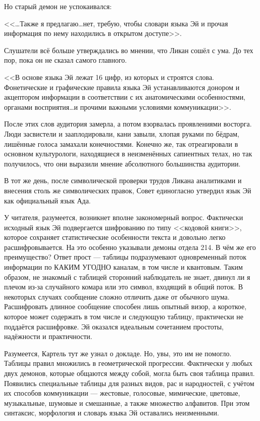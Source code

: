\documentclass[a4paper,10pt]{book}
\begin{document}
Но старый демон не успокаивался:

<<\dots Также я предлагаю\ldots нет, требую, чтобы словари языка Эй и прочая 
информация по нему находились в открытом доступе>>.

Слушатели всё больше утверждались во мнении, что Ликан сошёл с ума. До тех пор, 
пока он не сказал самого главного.

<<В основе языка Эй лежат 16 цифр, из которых и строятся слова. Фонетические и 
графические правила языка Эй устанавливаются донором и акцептором информации в 
соответствии с их анатомическими особенностями, органами восприятия\ldots и 
прочими важными условиями коммуникации>>.

После этих слов аудитория замерла, а потом взорвалась проявлениями восторга. 
Люди засвистели и зааплодировали, кани завыли, хлопая руками по бёдрам, 
лишённые голоса замахали конечностями. Конечно же, так отреагировали в основном 
культурологи, находящиеся в неизменённых сапиентных телах, но так получилось, 
что они выразили мнение абсолютного большинства аудитории.

В тот же день, после символической проверки трудов Ликана аналитиками и 
внесения столь же символических правок, Совет единогласно утвердил язык Эй как 
официальный язык Ада.

У читателя, разумеется, возникнет вполне закономерный вопрос. Фактически 
исходный язык Эй подвергается
шифрованию по типу <<кодовой книги>>, которое сохраняет статистические 
особенности текста и довольно легко расшифровывается. На это особенно указывали 
демоны отдела 214. В чём же его преимущество? Ответ прост --- таблицы 
подразумевают одновременный поток 
информации по КАКИМ УГОДНО каналам, в том числе и квантовым. Таким образом, не 
знакомый с таблицей сторонний наблюдатель не знает, двинул ли я плечом из-за 
случайного комара или это символ, входящий в общий поток. В некоторых случаях 
сообщение сложно отличить даже от обычного шума. Расшифровать длинное сообщение 
способен лишь опытный визор, а короткое, которое может содержать в том числе и 
следующую таблицу, практически не поддаётся расшифровке.  Эй оказался идеальным 
сочетанием простоты, надёжности и практичности.

Разумеется, Картель тут же узнал о докладе. Но, увы, это им не помогло. Таблицы 
правил множились в геометрической прогрессии. Фактически у любых двух демонов, 
которые общаются между собой, могла быть своя таблица правил. Появились 
специальные таблицы для разных видов, рас и народностей, с учётом их способов 
коммуникации --- жестовые, голосовые, мимические, цветовые, музыкальные, 
шумовые и смешанные, а также множество алфавитов. При этом синтаксис, 
морфология и словарь языка Эй оставались неизменными.
\end{document}
